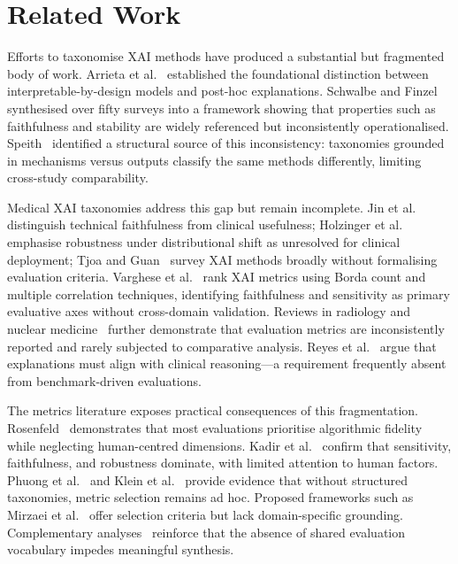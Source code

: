 \section{Related Work}

Efforts to taxonomise XAI methods have produced a substantial but fragmented body of work. Arrieta et al.~\cite{Arrieta2020XAI} established the foundational distinction between interpretable-by-design models and post-hoc explanations. Schwalbe and Finzel~\cite{schwalbe2024comprehensive} synthesised over fifty surveys into a framework showing that properties such as faithfulness and stability are widely referenced but inconsistently operationalised. Speith~\cite{speith2022review} identified a structural source of this inconsistency: taxonomies grounded in mechanisms versus outputs classify the same methods differently, limiting cross-study comparability.

Medical XAI taxonomies address this gap but remain incomplete. Jin et al.~\cite{jin2023guidelines} distinguish technical faithfulness from clinical usefulness; Holzinger et al.~\cite{holzinger2022information} emphasise robustness under distributional shift as unresolved for clinical deployment; Tjoa and Guan~\cite{Tjoa2021MedicalXAI} survey XAI methods broadly without formalising evaluation criteria. Varghese et al.~\cite{Varghese2025OnDE} rank XAI metrics using Borda count and multiple correlation techniques, identifying faithfulness and sensitivity as primary evaluative axes without cross-domain validation. Reviews in radiology and nuclear medicine~\cite{groen2022systematic,de2023explainable,saw2025current} further demonstrate that evaluation metrics are inconsistently reported and rarely subjected to comparative analysis. Reyes et al.~\cite{reyes2020interpretability} argue that explanations must align with clinical reasoning---a requirement frequently absent from benchmark-driven evaluations.

The metrics literature exposes practical consequences of this fragmentation. Rosenfeld~\cite{rosenfeld2021better} demonstrates that most evaluations prioritise algorithmic fidelity while neglecting human-centred dimensions. Kadir et al.~\cite{kadir2023evaluation} confirm that sensitivity, faithfulness, and robustness dominate, with limited attention to human factors. Phuong et al.~\cite{phuong2023benchmarking} and Klein et al.~\cite{Klein2024NavigatingTM} provide evidence that without structured taxonomies, metric selection remains ad hoc. Proposed frameworks such as Mirzaei et al.~\cite{mirzaei2023xai} offer selection criteria but lack domain-specific grounding. Complementary analyses~\cite{coroama2022evaluation,boggust2023saliency} reinforce that the absence of shared evaluation vocabulary impedes meaningful synthesis.

